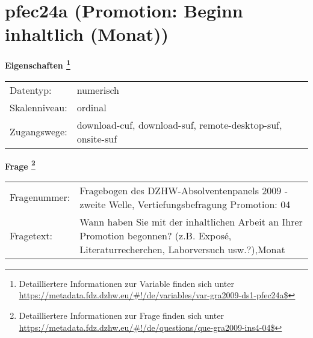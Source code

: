 
    \setcounter{footnote}{0}

    \vspace*{-1.8cm}
	\section{pfec24a (Promotion: Beginn inhaltlich (Monat))}
	\label{section:pfec24a}



    \vspace*{0.5cm}
    \noindent\textbf{Eigenschaften
	\footnote{Detailliertere Informationen zur Variable finden sich unter
		\url{https://metadata.fdz.dzhw.eu/\#!/de/variables/var-gra2009-ds1-pfec24a$}}}\\
	\begin{tabularx}{\hsize}{@{}lX}
	Datentyp: & numerisch \\
	Skalenniveau: & ordinal \\
	Zugangswege: &
	  download-cuf, 
	  download-suf, 
	  remote-desktop-suf, 
	  onsite-suf
 \\
    \end{tabularx}



				\vspace*{0.5cm}
                \noindent\textbf{Frage
	                \footnote{Detailliertere Informationen zur Frage finden sich unter
		              \url{https://metadata.fdz.dzhw.eu/\#!/de/questions/que-gra2009-ins4-04$}}}\\
				\begin{tabularx}{\hsize}{@{}lX}
					Fragenummer: &
					  Fragebogen des DZHW-Absolventenpanels 2009 - zweite Welle, Vertiefungsbefragung Promotion:
					  04
 \\
					Fragetext: & Wann haben Sie mit der inhaltlichen Arbeit an Ihrer Promotion begonnen? (z.B. Exposé, Literaturrecherchen, Laborversuch usw.?),Monat \\
				\end{tabularx}





